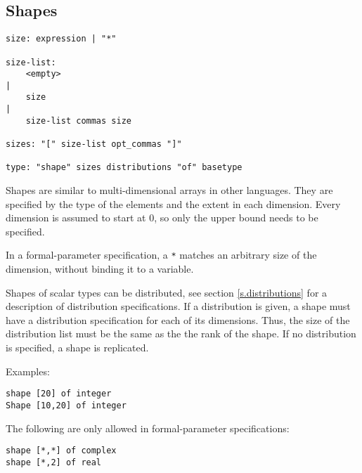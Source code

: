 \documentclass[a4paper]{article}
\begin{document}
\subsection{Shapes}
\label{s.shapetype}
\begin{verbatim}
size: expression | "*"

size-list:
    <empty>
|
    size
|
    size-list commas size

sizes: "[" size-list opt_commas "]"

type: "shape" sizes distributions "of" basetype
\end{verbatim}
Shapes are similar to multi-dimensional arrays in other languages.
They are specified by the type of the elements and the extent in each
dimension. Every dimension is assumed to start at 0,
so only the upper bound needs to be specified.
\par
In a formal-parameter specification, a \verb"*" matches an arbitrary size
of the dimension, without binding it to a variable.
\par
Shapes of scalar types can be distributed, see section \ref{s.distributions}
for a description of distribution specifications.
If a distribution is given, a shape must have a distribution specification
for each of its dimensions.
Thus, the size of the distribution list must be the same as the the rank
of the shape. If no distribution is specified, a shape is replicated.
\par
Examples:
\begin{verbatim}
shape [20] of integer
Shape [10,20] of integer
\end{verbatim}
The following are only allowed in formal-parameter specifications:
\begin{verbatim}
shape [*,*] of complex
shape [*,2] of real
\end{verbatim}
\end{document}
